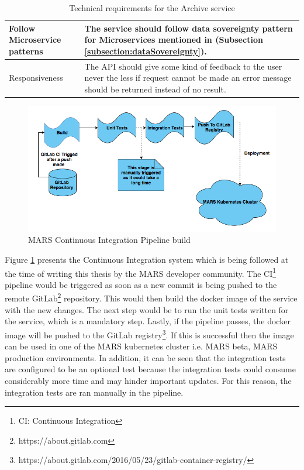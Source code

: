 \begin{table}[h!]
\begin{tabular}{|p{3cm}|p{12cm}|}
            \hline
                Follow Microservice patterns & The service should follow data sovereignty pattern for Microservices mentioned in 
                (Subsection \ref{subsection:dataSovereignty}).\\ 
            \hline
                Responsiveness & The API should give some kind of feedback to the user never the less if request cannot be made an 
                error message should be returned instead of no result. \\      
            \hline
        \end{tabular}
        \caption{Technical requirements for the Archive service}
        \label{table: Technical Requirements}     
    \end{table}    
  
    \begin{figure}[H]
        \centering \includegraphics[scale=0.5]{grafiken/CIbuild.png}
        \caption{MARS Continuous Integration Pipeline build}
        \label{fig:CIbuild}
    \end{figure}

    Figure \ref{fig:CIbuild} presents the Continuous Integration system which is being followed at the time of writing this thesis by the MARS developer community.
    The CI\footnote{CI: Continuous Integration} pipeline would be triggered as soon as a new commit is being pushed to the remote 
    GitLab\footnote{https://about.gitlab.com} repository. This would then build the docker image of the service with the new changes. The next step would be to
    run the unit tests written for the service, which is a mandatory step. Lastly, if the pipeline passes, the docker image will be pushed
    to the GitLab registry\footnote{https://about.gitlab.com/2016/05/23/gitlab-container-registry/}. If this is successful then the image can be used in one of 
    the MARS kubernetes cluster i.e. MARS beta, MARS production environments. In addition,
    it can be seen that the integration tests are configured to be an optional test because the integration tests could consume considerably more time and may hinder
    important updates. For this reason, the integration tests are ran manually in the pipeline.